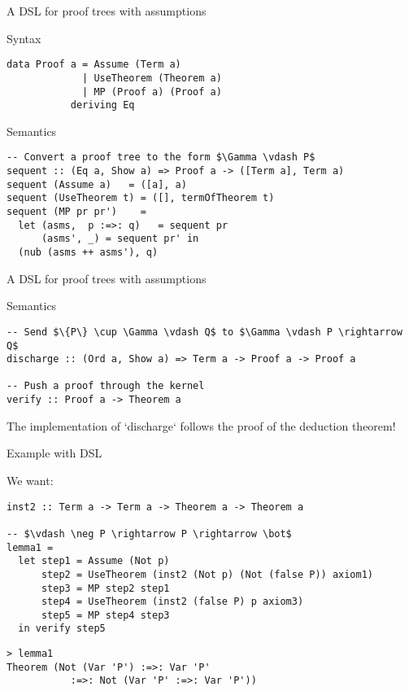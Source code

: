 \documentclass[presentation]{beamer}
\begin{document}
\begin{frame}[fragile,label={sec:orgheadline15}]{A DSL for proof trees with assumptions}
 \begin{block}{Syntax}
\begin{verbatim}
data Proof a = Assume (Term a)
             | UseTheorem (Theorem a)
             | MP (Proof a) (Proof a)
           deriving Eq
\end{verbatim}
\end{block}

\begin{block}{Semantics}
\begin{verbatim}
-- Convert a proof tree to the form $\Gamma \vdash P$
sequent :: (Eq a, Show a) => Proof a -> ([Term a], Term a)
sequent (Assume a)   = ([a], a)
sequent (UseTheorem t) = ([], termOfTheorem t)
sequent (MP pr pr')    =
  let (asms,  p :=>: q)   = sequent pr
      (asms', _) = sequent pr' in
  (nub (asms ++ asms'), q)
\end{verbatim}
\end{block}
\end{frame}

\begin{frame}[fragile,label={sec:orgheadline16}]{A DSL for proof trees with assumptions}
 \begin{block}{Semantics}
\begin{verbatim}
-- Send $\{P\} \cup \Gamma \vdash Q$ to $\Gamma \vdash P \rightarrow Q$
discharge :: (Ord a, Show a) => Term a -> Proof a -> Proof a

-- Push a proof through the kernel
verify :: Proof a -> Theorem a
\end{verbatim}
\end{block}

\begin{block}{}
The implementation of `discharge` follows the proof of the deduction theorem!
\end{block}
\end{frame}

\begin{frame}[fragile,label={sec:orgheadline17}]{Example with DSL}
 \begin{block}{We want:}
\small
\begin{verbatim}
inst2 :: Term a -> Term a -> Theorem a -> Theorem a

-- $\vdash \neg P \rightarrow P \rightarrow \bot$
lemma1 =
  let step1 = Assume (Not p)
      step2 = UseTheorem (inst2 (Not p) (Not (false P)) axiom1)
      step3 = MP step2 step1
      step4 = UseTheorem (inst2 (false P) p axiom3)
      step5 = MP step4 step3
  in verify step5
\end{verbatim}

\begin{verbatim}
> lemma1
Theorem (Not (Var 'P') :=>: Var 'P'
           :=>: Not (Var 'P' :=>: Var 'P'))
\end{verbatim}
\end{block}
\end{frame}
\end{document}
